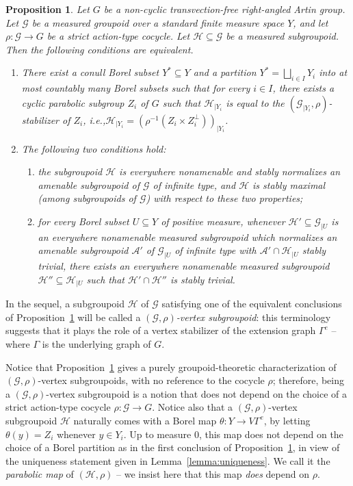 \documentclass[11pt]{article}
\newcommand{\ie}{i.e.,\xspace}
\numberwithin{equation}{section}
\let\mathcal\mathscr
\theoremstyle{plain}
\newtheorem{prop}[theo]{Proposition}
\theoremstyle{definition}
\let\Dunion\bigsqcup
\newcommand{\cala}{\mathcal{A}}
\newcommand{\calg}{\mathcal{G}}
\newcommand{\calh}{\mathcal{H}}
\begin{document}
\begin{prop}
\label{prop:raag}
Let $G$ be a non-cyclic transvection-free right-angled Artin group. Let $\calg$ be a measured groupoid over a standard finite measure space $Y$, and let \hbox{$\rho:\calg\!\to\!G$} be a strict action-type cocycle. Let $\calh\subseteq\calg$ be a measured subgroupoid. Then the following conditions are equivalent.
\begin{enumerate}
\item\label{prop:raag1} There exist a conull Borel subset $Y^*\subseteq Y$ and a partition $Y^*=\Dunion_{i\in I}Y_i$ into at most countably many Borel subsets such that for every $i\in I$, there exists a cyclic parabolic subgroup $Z_i$ of $G$ such that $\calh_{|Y_i}$ is equal to the $(\calg_{|Y_i},\rho)$-stabilizer of $Z_i$, \ie $\calh_{|Y_i}=(\rho^{-1}(Z_i\times Z_i^{\perp}))_{|Y_i}$.
\item\label{prop:raag2} The following two conditions hold:
\begin{enumerate}
\item\label{prop:raag2a} the subgroupoid $\calh$ is everywhere nonamenable and stably normalizes an amenable subgroupoid of $\calg$ of infinite type, and $\calh$ is stably maximal (among subgroupoids of $\calg$) with respect to these two properties;
\item\label{prop:raag2b} for every Borel subset $U\subseteq Y$ of positive measure, whenever $\calh'\subseteq\calg_{|U}$ is an everywhere nonamenable measured subgroupoid which normalizes an amenable subgroupoid $\cala'$ of $\calg_{|U}$ of infinite type with $\cala'\cap\calh_{|U}$ stably trivial, there exists an everywhere nonamenable measured subgroupoid $\calh''\subseteq\calh_{|U}$ such that $\calh'\cap\calh''$ is stably trivial.
\end{enumerate}
\end{enumerate}
\end{prop}

In the sequel, a subgroupoid $\calh$ of $\calg$ satisfying one of the equivalent conclusions of Proposition~\ref{prop:raag} will be called a \emph{$(\calg,\rho)$-vertex subgroupoid}: this terminology suggests that it plays the role of a vertex stabilizer of the extension graph $\Gamma^e$ -- where $\Gamma$ is the underlying graph of $G$.

Notice that Proposition~\ref{prop:raag} gives a purely groupoid-theoretic characterization of $(\calg,\rho)$-vertex subgroupoids, with no reference to the cocycle $\rho$; therefore, being a $(\calg,\rho)$-vertex subgroupoid is a notion that does not depend on the choice of a strict action-type cocycle $\rho:\calg\to G$. Notice also that a $(\calg,\rho)$-vertex subgroupoid $\calh$ naturally comes with a Borel map $\theta:Y\to V\Gamma^e$, by letting $\theta(y)=Z_i$ whenever $y\in Y_i$. Up to measure $0$, this map does not depend on the choice of a Borel partition as in the first conclusion of Proposition~\ref{prop:raag}, in view of the uniqueness statement given in Lemma~\ref{lemma:uniqueness}. We call it the \emph{parabolic map} of $(\calh,\rho)$ -- we insist here that this map \emph{does} depend on $\rho$.
\end{document}
